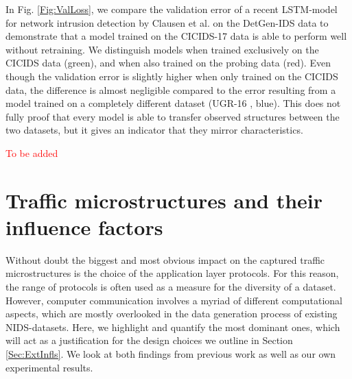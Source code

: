 \documentclass[runningheads]{llncs}
\begin{document}
In Fig. \ref{Fig:ValLoss}, we compare the validation error of a recent LSTM-model for network intrusion detection by Clausen et al. \cite{henryLSTM} on the DetGen-IDS data to demonstrate that a model trained on the CICIDS-17 data is able to perform well without retraining. We distinguish models when trained exclusively on the CICIDS data (green), and when also trained on the probing data (red). 
Even though the validation error is slightly higher when only trained on the CICIDS data, the difference is almost negligible compared to the error resulting from a model trained on a completely different dataset (UGR-16 \cite{macia2018ugr}, blue). This does not fully proof that every model is able to transfer observed structures between the two datasets, but it gives an indicator that they mirror characteristics.




\textcolor{red}{To be added}




\section{Traffic microstructures and their influence factors}\label{Sec:DetGenMicro}

Without doubt the biggest and most obvious impact on the captured traffic microstructures is the choice of the application layer protocols. For this reason, the range of protocols is often used as a measure for the diversity of a dataset. However, computer communication involves a myriad of different computational aspects, which are mostly overlooked in the data generation process of existing NIDS-datasets. Here, we highlight and quantify the most dominant ones, which will act as a justification for the design choices we outline in Section \ref{Sec:ExtInfls}. We look at both findings from previous work as well as our own experimental results.
\end{document}
